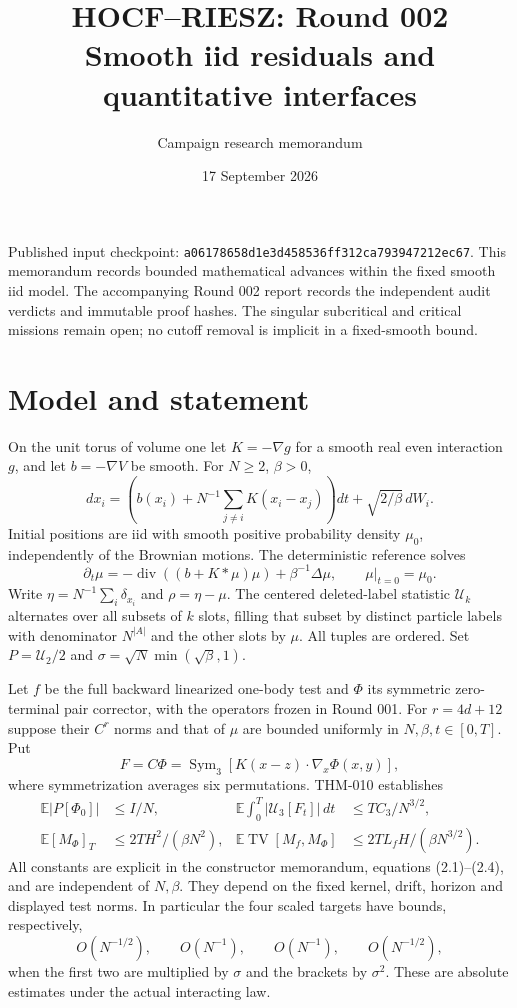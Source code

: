 \documentclass[11pt]{article}
\title{HOCF--RIESZ: Round 002\\Smooth iid residuals and quantitative interfaces}
\author{Campaign research memorandum}
\date{17 September 2026}
\newcommand{\U}{\mathcal U}
\newcommand{\E}{\mathbb E}
\begin{document}
\maketitle
\noindent Published input checkpoint:
\texttt{a06178658d1e3d458536ff312ca793947212ec67}.
This memorandum records bounded mathematical advances within the fixed smooth
iid model. The accompanying Round 002 report records the independent audit
verdicts and immutable proof hashes. The singular subcritical and critical
missions remain open; no cutoff removal is implicit in a fixed-smooth bound.

\section{Model and statement}
On the unit torus of volume one let $K=-\nabla g$ for a smooth real even
interaction $g$, and let $b=-\nabla V$ be smooth. For $N\ge2$, $\beta>0$,
\[
 dx_i=\left(b(x_i)+N^{-1}\sum_{j\ne i}K(x_i-x_j)\right)dt
             +\sqrt{2/\beta}\,dW_i.
\]
Initial positions are iid with smooth positive probability density $\mu_0$,
independently of the Brownian motions. The deterministic reference solves
\[
 \partial_t\mu=-\operatorname{div}((b+K*\mu)\mu)+\beta^{-1}\Delta\mu,
 \qquad \mu|_{t=0}=\mu_0.
\]
Write $\eta=N^{-1}\sum_i\delta_{x_i}$ and $\rho=\eta-\mu$.
The centered deleted-label statistic $\U_k$ alternates over all subsets of
$k$ slots, filling that subset by distinct particle labels with denominator
$N^{|A|}$ and the other slots by $\mu$. All tuples are ordered.
Set $P=\U_2/2$ and $\sigma=\sqrt N\min(\sqrt\beta,1)$.

Let $f$ be the full backward linearized one-body test and $\Phi$ its symmetric
zero-terminal pair corrector, with the operators frozen in Round 001. For
$r=4d+12$ suppose their $C^r$ norms and that of $\mu$ are bounded uniformly in
$N,\beta,t\in[0,T]$. Put
\[
 F=C\Phi=\operatorname{Sym}_3
       [K(x-z)\cdot\nabla_x\Phi(x,y)],
\]
where symmetrization averages six permutations. THM-010 establishes
\begin{align*}
 \E|P[\Phi_0]|&\le I/N,&
 \E\int_0^T|\U_3[F_t]|\,dt&\le TC_3/N^{3/2},\\
 \E[M_\Phi]_T&\le 2TH^2/(\beta N^2),&
 \E\operatorname{TV}[M_f,M_\Phi]&\le2TL_fH/(\beta N^{3/2}).
\end{align*}
All constants are explicit in the constructor memorandum, equations
(2.1)--(2.4), and are independent of $N,\beta$. They depend on the fixed
kernel, drift, horizon and displayed test norms. In particular the four
scaled targets have bounds, respectively,
\[
 O(N^{-1/2}),\qquad O(N^{-1}),\qquad O(N^{-1}),\qquad O(N^{-1/2}),
\]
when the first two are multiplied by $\sigma$ and the brackets by $\sigma^2$.
These are absolute estimates under the actual interacting law.
\end{document}
